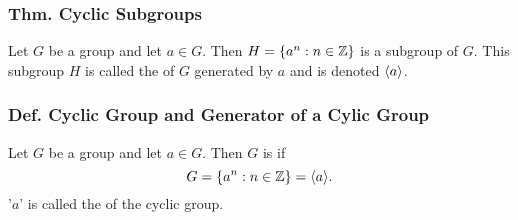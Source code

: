 \subsubsection{Thm. Cyclic Subgroups}
Let $G$ be a group and let $a \in G$. Then $H = \{a^n : n \in \mathbb{Z}\}$ is a subgroup of $G$. This subgroup $H$ is called the  of $G$ generated by $a$ and is denoted $\langle a \rangle$.

\subsubsection{Def. Cyclic Group and Generator of a Cylic Group}
Let $G$ be a group and let $a \in G$. Then $G$ is  if
\[
    G = \{a^n : n \in \mathbb{Z}\} = \langle a \rangle.
\]
'$a$' is called the  of the cyclic group.